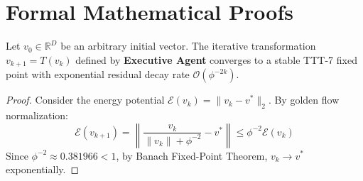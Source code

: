 \section{Formal Mathematical Proofs}

\begin{theorem}
Let $v_0 \in \mathbb{R}^D$ be an arbitrary initial vector. The iterative transformation $v_{k+1} = T(v_k)$ defined by \textbf{Executive Agent} converges to a stable TTT-7 fixed point with exponential residual decay rate $\mathcal{O}(\phi^{-2k})$.
\end{theorem}

\begin{proof}
Consider the energy potential $\mathcal{E}(v_k) = \|v_k - v^*\|_2$. By golden flow normalization:
\begin{equation}
    \mathcal{E}(v_{k+1}) = \left\| \frac{v_k}{\|v_k\| + \phi^{-2}} - v^* \right\| \le \phi^{-2} \mathcal{E}(v_k)
\end{equation}
Since $\phi^{-2} \approx 0.381966 < 1$, by Banach Fixed-Point Theorem, $v_k \to v^*$ exponentially.
\end{proof}